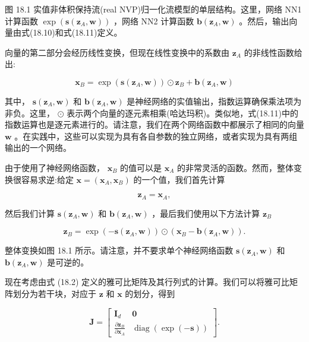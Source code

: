 \documentclass[10pt]{article}
\begin{document}
图 18.1 实值非体积保持流(real NVP)归一化流模型的单层结构。这里，网络 NN1 计算函数 \(\exp \left( {\mathbf{s}\left( {{\mathbf{z}}_{A},\mathbf{w}}\right) }\right)\) ，网络 NN2 计算函数 \(\mathbf{b}\left( {{\mathbf{z}}_{A},\mathbf{w}}\right)\) 。然后，输出向量由式(18.10)和式(18.11)定义。

向量的第二部分会经历线性变换，但现在线性变换中的系数由 \({\mathbf{z}}_{A}\) 的非线性函数给出:

\[
{\mathbf{x}}_{B} = \exp \left( {\mathbf{s}\left( {{\mathbf{z}}_{A},\mathbf{w}}\right) }\right)  \odot  {\mathbf{z}}_{B} + \mathbf{b}\left( {{\mathbf{z}}_{A},\mathbf{w}}\right)  \tag{18.11}
\]

其中， \(\mathbf{s}\left( {{\mathbf{z}}_{A},\mathbf{w}}\right)\) 和 \(\mathbf{b}\left( {{\mathbf{z}}_{A},\mathbf{w}}\right)\) 是神经网络的实值输出，指数运算确保乘法项为非负。这里， \(\odot\) 表示两个向量的逐元素相乘(哈达玛积)。类似地，式(18.11)中的指数运算也是逐元素进行的。请注意，我们在两个网络函数中都展示了相同的向量 \(\mathbf{w}\) 。在实践中，这些可以实现为具有各自参数的独立网络，或者实现为具有两组输出的一个网络。

由于使用了神经网络函数， \({\mathbf{x}}_{B}\) 的值可以是 \({\mathbf{x}}_{A}\) 的非常灵活的函数。然而，整体变换很容易求逆:给定 \(\mathbf{x} = \left( {{\mathbf{x}}_{A},{\mathbf{x}}_{B}}\right)\) 的一个值，我们首先计算

\[
{\mathbf{z}}_{A} = {\mathbf{x}}_{A}, \tag{18.12}
\]

然后我们计算 \(\mathbf{s}\left( {{\mathbf{z}}_{A},\mathbf{w}}\right)\) 和 \(\mathbf{b}\left( {{\mathbf{z}}_{A},\mathbf{w}}\right)\) ，最后我们使用以下方法计算 \({\mathbf{z}}_{B}\)

\[
{\mathbf{z}}_{B} = \exp \left( {-\mathbf{s}\left( {{\mathbf{z}}_{A},\mathbf{w}}\right) }\right)  \odot  \left( {{\mathbf{x}}_{B} - \mathbf{b}\left( {{\mathbf{z}}_{A},\mathbf{w}}\right) }\right) . \tag{18.13}
\]

整体变换如图 18.1 所示。请注意，并不要求单个神经网络函数 \(\mathbf{s}\left( {{\mathbf{z}}_{A},\mathbf{w}}\right)\) 和 \(\mathbf{b}\left( {{\mathbf{z}}_{A},\mathbf{w}}\right)\) 是可逆的。

现在考虑由式 (18.2) 定义的雅可比矩阵及其行列式的计算。我们可以将雅可比矩阵划分为若干块，对应于 \(\mathbf{z}\) 和 \(\mathbf{x}\) 的划分，得到

\[
\mathbf{J} = \left\lbrack  \begin{matrix} {\mathbf{I}}_{d} & \mathbf{0} \\  \frac{\partial {\mathbf{z}}_{B}}{\partial {\mathbf{x}}_{A}} & \operatorname{diag}\left( {\exp \left( {-\mathbf{s}}\right) }\right)  \end{matrix}\right\rbrack  . \tag{18.14}
\]
\end{document}
